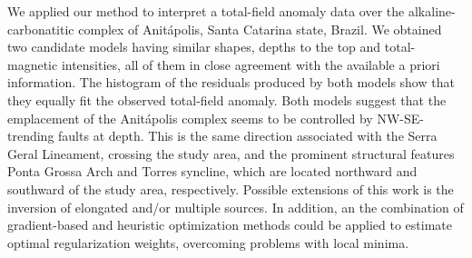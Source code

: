 We applied our method to interpret a total-field anomaly data over the 
alkaline-carbonatitic complex of Anit{\'a}polis, Santa Catarina state, Brazil. 
We obtained two candidate models having similar shapes, depths to the top and 
total-magnetic intensities, all of them in close agreement with the available 
a priori information. 
The histogram of the residuals produced by both models show that they equally 
fit the observed total-field anomaly.
Both models suggest that the emplacement of the 
Anit{\'a}polis complex seems to be controlled by NW-SE-trending faults at depth.
This is the same direction associated with the Serra Geral Lineament, 
crossing the study area, and the prominent structural features 
Ponta Grossa Arch and Torres syncline, which are located 
northward and southward of the study area, respectively.
Possible extensions of this work is the inversion of elongated and/or multiple 
sources. In addition, an the combination of gradient-based and heuristic optimization 
methods could be applied to estimate optimal regularization weights, 
overcoming problems with local minima.